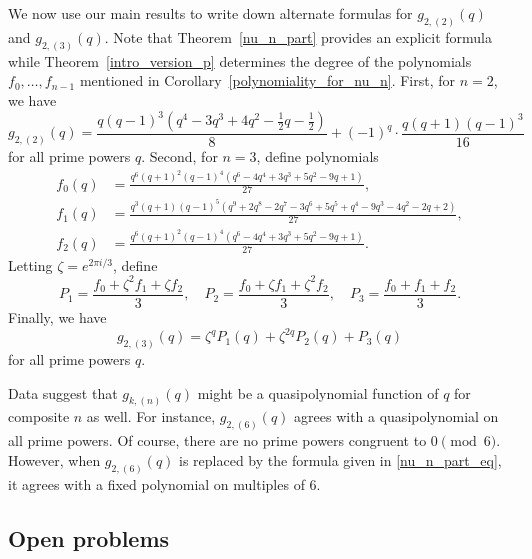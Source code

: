 \begin{example}
We now use our main results to write down alternate formulas for \(g_{2,(2)} (q)\) and \(g_{2,(3)} (q)\).
Note that Theorem~\ref{nu_n_part} provides an explicit formula while Theorem~\ref{intro_version_p} determines the degree of the polynomials \(f_0,\ldots,f_{n-1}\) mentioned in Corollary~\ref{polynomiality_for_nu_n}.
First, for \(n = 2\), we have
\begin{equation}
g_{2,(2)}(q)
=
\frac{q (q - 1)^3 (q^4 - 3q^3 + 4q^2 - \tfrac{1}{2}q - \tfrac{1}{2})}{8}
+(-1)^q
\cdot
\frac{q(q + 1)(q - 1)^3}{16}
\end{equation}
for all prime powers \(q\).
Second, for \(n = 3\), define polynomials
\begin{align*}
f_0 (q) & = \frac{q^6 (q + 1)^2 (q - 1)^4  (q^6 - 4q^4 + 3q^3 + 5q^2 - 9q + 1)}{27}, \\
f_1 (q) & = \frac{q^3 (q + 1)  (q - 1)^5 (q^9 + 2q^8 - 2q^7 - 3q^6 + 5q^5 + q^4 - 9q^3 - 4q^2 - 2q + 2)}{27}, \\
f_2 (q) & = \frac{q^6 (q + 1)^2 (q - 1)^4  (q^6 - 4q^4 + 3q^3 + 5q^2 - 9q + 1)}{27}.
\end{align*}
Letting \(\zeta = e^{2 \pi i / 3}\), define
\begin{equation*}
P_1 = \frac{f_0 + \zeta^2 f_1 + \zeta f_2}{3},
\quad
P_2 = \frac{f_0 + \zeta f_1 + \zeta^2 f_2}{3},
\quad
P_3 = \frac{f_0 + f_1 + f_2}{3}.
\end{equation*}
Finally, we have
\begin{equation}
g_{2,(3)} (q) = \zeta^q P_1(q) + \zeta^{2q} P_2(q) + P_3(q)
\end{equation}
for all prime powers \(q\).
\end{example}





\begin{remark}
\label{bummer}
Data suggest that \(g_{k,(n)}(q)\) might be a quasipolynomial function of \(q\) for composite \(n\) as well.
For instance, \(g_{2,(6)}(q)\) agrees with a quasipolynomial on all prime powers.
Of course, there are no prime powers congruent to \(0 \pmod{6}\).
However, when \(g_{2,(6)}(q)\) is replaced by the formula given in \eqref{nu_n_part_eq}, it agrees with a fixed polynomial on multiples of \(6\).
\end{remark}






\subsection{Open problems}


